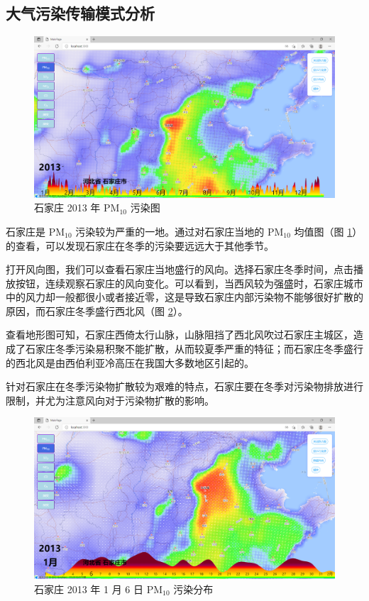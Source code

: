 \documentclass[UTF8]{ctexrep}
\begin{document}
    \subsection{大气污染传输模式分析}
    
    \begin{figure}[h!]
        \centering
        \includegraphics[width=15cm,keepaspectratio]{images/shijiazhuang_2013PM10.png}
        \caption{石家庄 2013 年 $\mathrm{PM}_{10}$ 污染图}
        \label{fig:shijiazhuang_2013PM10}
    \end{figure}
    石家庄是 $\mathrm{PM}_{10}$ 污染较为严重的一地。通过对石家庄当地的 $\mathrm{PM}_{10}$ 均值图（图 \ref{fig:shijiazhuang_2013PM10}）的查看，可以发现石家庄在冬季的污染要远远大于其他季节。
    \par
    打开风向图，我们可以查看石家庄当地盛行的风向。选择石家庄冬季时间，点击播放按钮，连续观察石家庄的风向变化。可以看到，当西风较为强盛时，石家庄城市中的风力却一般都很小或者接近零，这是导致石家庄内部污染物不能够很好扩散的原因，而石家庄冬季盛行西北风（图 \ref{fig:shijiazhuang_wind1}）。
	\par    
    查看地形图可知，石家庄西倚太行山脉，山脉阻挡了西北风吹过石家庄主城区，造成了石家庄冬季污染易积聚不能扩散，从而较夏季严重的特征；而石家庄冬季盛行的西北风是由西伯利亚冷高压在我国大多数地区引起的。
    \par 
    针对石家庄在冬季污染物扩散较为艰难的特点，石家庄要在冬季对污染物排放进行限制，并尤为注意风向对于污染物扩散的影响。
    \begin{figure}[h!]
        \centering
        \includegraphics[width=15cm,keepaspectratio]{images/shijiazhuang_wind1.png}
        \caption{石家庄 2013 年 1 月 6 日 $\mathrm{PM}_{10}$ 污染分布}
        \label{fig:shijiazhuang_wind1}
    \end{figure}
\end{document}
